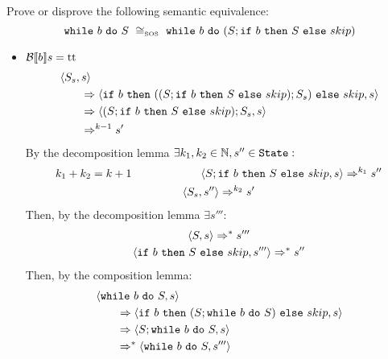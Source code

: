 \begin{exercise}{
    Prove or disprove the following semantic equivalence:
    \[ \wwhile{b}{S}\ \SOScong\ \wwhile{b}{(S;\wif{b}{S}{skip})} \]
}
\begin{itemize}
\begin{itemize}
\begin{itemize}
\begin{align*}
                                \\&\qquad\Rightarrow \instr{\wif{b}{(S; \wwhile{b}{S})}{skip}}{s}
                                \\&\qquad\Rightarrow \instr{skip}{s}
                                \\&\qquad\Rightarrow s
                            \end{align*}
                        \item $\mathcal{B} \llbracket b \rrbracket s = \text{tt}$
                            \begin{align*}
                                &\left<S_s, s\right>
                                \\&\qquad\Rightarrow \left<\texttt{if}\ b\ \texttt{then}\ ((S;\texttt{if}\ b\ \texttt{then}\ S\ \texttt{else}\ skip);S_s)\ \texttt{else}\ skip, s\right>
                                \\&\qquad\Rightarrow \left<(S;\texttt{if}\ b\ \texttt{then}\ S\ \texttt{else}\ skip);S_s, s\right>
                                \\&\qquad\Rightarrow^{k - 1} s'
                            \end{align*}
                            By the decomposition lemma $\exists k_1, k_2 \in \mathbb{N}, s'' \in \texttt{State} :$
                            \begin{gather*}
                                k_1 + k_2 = k + 1 \qquad\qquad\qquad \left<S;\texttt{if}\ b\ \texttt{then}\ S\ \texttt{else}\ skip, s\right> \Rightarrow^{k_1} s'' \\
                                \left<S_s, s''\right> \Rightarrow^{k_2} s'
                            \end{gather*}
                            Then, by the decomposition lemma $\exists s''' :$
                            \begin{gather*}
                                \left<S, s\right> \Rightarrow^* s''' \\
                                \left<\texttt{if}\ b\ \texttt{then}\ S\ \texttt{else}\ skip, s'''\right> \Rightarrow^* s''
                            \end{gather*}
                            Then, by the composition lemma:
                            \begin{align*}
                                &\instr{\wwhile{b}{S}}{s}
                                \\&\qquad\Rightarrow \instr{\wif{b}{(S; \wwhile{b}{S})}{skip}}{s}
                                \\&\qquad\Rightarrow \instr{S; \wwhile{b}{S}}{s}
                                \\&\qquad\Rightarrow^* \instr{\wwhile{b}{S}}{s'''}

\end{align*}
\end{itemize}
\end{itemize}
\end{itemize}
\end{exercise}
